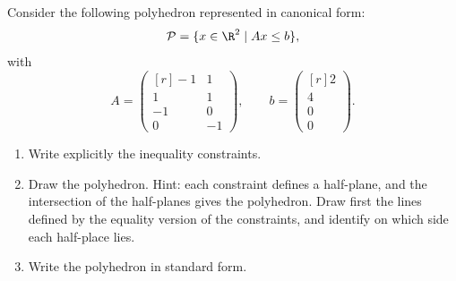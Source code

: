 Consider the following polyhedron represented in canonical form:
\[
 \mathcal{P} = \{x \in \R^2 \mid Ax \leq b\},
\]
with
\[
 A = \begin{pmatrix*}[r] -1 &  1 \\  1 &  1 \\ -1 &  0 \\  0 & -1 \end{pmatrix*}, \qquad b = \begin{pmatrix*}[r] 2 \\ 4 \\ 0 \\ 0  \end{pmatrix*}. 
\]

\begin{enumerate}
    \item Write explicitly the inequality constraints.
    \item Draw the polyhedron. Hint: each  constraint defines a half-plane, and the intersection
of the half-planes gives the polyhedron. Draw first the lines defined by the equality version of the constraints, and identify on which side each half-place lies. 
    \item Write the polyhedron in standard form.
\end{enumerate}


